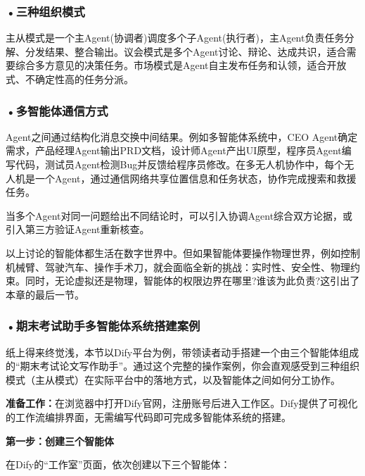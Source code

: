 \subsubsection*{\textbf{•三种组织模式}}





主从模式是一个主Agent(协调者)调度多个子Agent(执行者)，主Agent负责任务分解、分发结果、整合输出。议会模式是多个Agent讨论、辩论、达成共识，适合需要综合多方意见的决策任务。市场模式是Agent自主发布任务和认领，适合开放式、不确定性高的任务分派。


\subsubsection*{\textbf{•多智能体通信方式}}
Agent之间通过结构化消息交换中间结果。例如多智能体系统中，CEO Agent确定需求，产品经理Agent输出PRD文档，设计师Agent产出UI原型，程序员Agent编写代码，测试员Agent检测Bug并反馈给程序员修改。在多无人机协作中，每个无人机是一个Agent，通过通信网络共享位置信息和任务状态，协作完成搜索和救援任务。

当多个Agent对同一问题给出不同结论时，可以引入协调Agent综合双方论据，或引入第三方验证Agent重新核查。

以上讨论的智能体都生活在数字世界中。但如果智能体要操作物理世界，例如控制机械臂、驾驶汽车、操作手术刀，就会面临全新的挑战：实时性、安全性、物理约束。同时，无论虚拟还是物理，智能体的权限边界在哪里?谁该为此负责?这引出了本章的最后一节。



\subsubsection*{\textbf{•期末考试助手多智能体系统搭建案例}}

纸上得来终觉浅，本节以Dify平台为例，带领读者动手搭建一个由三个智能体组成的“期末考试论文写作助手”。通过这个完整的操作案例，你会直观感受到三种组织模式（主从模式）在实际平台中的落地方式，以及智能体之间如何分工协作。

\textbf{准备工作：}在浏览器中打开Dify官网，注册账号后进入工作区。Dify提供了可视化的工作流编排界面，无需编写代码即可完成多智能体系统的搭建。

\textbf{第一步：创建三个智能体}

在Dify的“工作室”页面，依次创建以下三个智能体：

